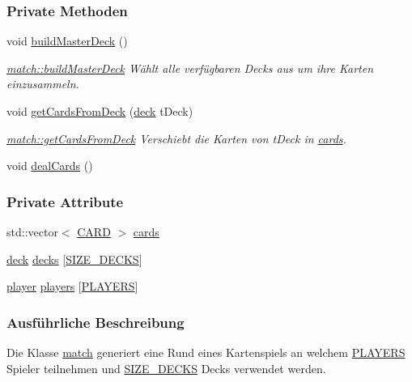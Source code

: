 \subsubsection*{Private Methoden}
\begin{DoxyCompactItemize}
\item 
void \hyperlink{classmatch_a46982e55a04f6a60fdd8057b5acbf64f}{build\-Master\-Deck} ()
\begin{DoxyCompactList}\small\item\em \hyperlink{classmatch_a46982e55a04f6a60fdd8057b5acbf64f}{match\-::build\-Master\-Deck} Wählt alle verfügbaren Decks aus um ihre Karten einzusammeln. \end{DoxyCompactList}\item 
void \hyperlink{classmatch_a690fc86b621fdd5367a35376fc85130a}{get\-Cards\-From\-Deck} (\hyperlink{classdeck}{deck} t\-Deck)
\begin{DoxyCompactList}\small\item\em \hyperlink{classmatch_a690fc86b621fdd5367a35376fc85130a}{match\-::get\-Cards\-From\-Deck} Verschiebt die Karten von t\-Deck in \hyperlink{classmatch_afe9f4e5f94c2c9873db6640281e12dcf}{cards}. \end{DoxyCompactList}\item 
void \hyperlink{classmatch_ab4c417d094231254db1d0fb16788d9d1}{deal\-Cards} ()
\end{DoxyCompactItemize}
\subsubsection*{Private Attribute}
\begin{DoxyCompactItemize}
\item 
std\-::vector$<$ \hyperlink{struct_c_a_r_d}{C\-A\-R\-D} $>$ \hyperlink{classmatch_afe9f4e5f94c2c9873db6640281e12dcf}{cards}
\item 
\hyperlink{classdeck}{deck} \hyperlink{classmatch_a98a4bea4adf4d10ede8436486cc38418}{decks} \mbox{[}\hyperlink{match_8h_a63cfbde7ca4628196a360676e43d810a}{S\-I\-Z\-E\-\_\-\-D\-E\-C\-K\-S}\mbox{]}
\item 
\hyperlink{classplayer}{player} \hyperlink{classmatch_a07c8604710b0af37d2e1c3f84e5fca6a}{players} \mbox{[}\hyperlink{match_8h_a35874ee321ab82a60db7957e8fd6c61c}{P\-L\-A\-Y\-E\-R\-S}\mbox{]}
\end{DoxyCompactItemize}


\subsubsection{Ausführliche Beschreibung}
Die Klasse \hyperlink{classmatch}{match} generiert eine Rund eines Kartenspiels an welchem \hyperlink{match_8h_a35874ee321ab82a60db7957e8fd6c61c}{P\-L\-A\-Y\-E\-R\-S} Spieler teilnehmen und \hyperlink{match_8h_a63cfbde7ca4628196a360676e43d810a}{S\-I\-Z\-E\-\_\-\-D\-E\-C\-K\-S} Decks verwendet werden. 

